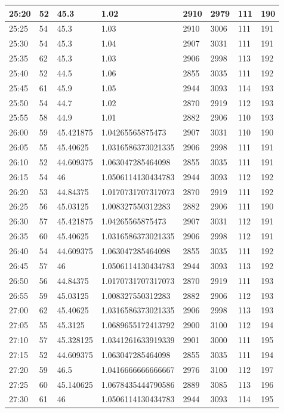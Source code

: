 \documentclass[
]{book}
\begin{document}
\begin{tabular}{l|l|l|l|l|l|l|l}
25:20 & 52 & 45.3 & 1.02 & 2910 & 2979 & 111 & 190\\
\hline
25:25 & 54 & 45.3 & 1.03 & 2910 & 3006 & 111 & 191\\
\hline
25:30 & 54 & 45.3 & 1.04 & 2907 & 3031 & 111 & 191\\
\hline
25:35 & 62 & 45.3 & 1.03 & 2906 & 2998 & 113 & 192\\
\hline
25:40 & 52 & 44.5 & 1.06 & 2855 & 3035 & 111 & 192\\
\hline
25:45 & 61 & 45.9 & 1.05 & 2944 & 3093 & 114 & 193\\
\hline
25:50 & 54 & 44.7 & 1.02 & 2870 & 2919 & 112 & 193\\
\hline
25:55 & 58 & 44.9 & 1.01 & 2882 & 2906 & 110 & 193\\
\hline
26:00 & 59 & 45.421875 & 1.04265565875473 & 2907 & 3031 & 110 & 190\\
\hline
26:05 & 55 & 45.40625 & 1.0316586373021335 & 2906 & 2998 & 111 & 191\\
\hline
26:10 & 52 & 44.609375 & 1.063047285464098 & 2855 & 3035 & 111 & 191\\
\hline
26:15 & 54 & 46 & 1.0506114130434783 & 2944 & 3093 & 112 & 192\\
\hline
26:20 & 53 & 44.84375 & 1.0170731707317073 & 2870 & 2919 & 111 & 192\\
\hline
26:25 & 56 & 45.03125 & 1.008327550312283 & 2882 & 2906 & 111 & 190\\
\hline
26:30 & 57 & 45.421875 & 1.04265565875473 & 2907 & 3031 & 112 & 191\\
\hline
26:35 & 60 & 45.40625 & 1.0316586373021335 & 2906 & 2998 & 112 & 191\\
\hline
26:40 & 54 & 44.609375 & 1.063047285464098 & 2855 & 3035 & 111 & 192\\
\hline
26:45 & 57 & 46 & 1.0506114130434783 & 2944 & 3093 & 113 & 192\\
\hline
26:50 & 56 & 44.84375 & 1.0170731707317073 & 2870 & 2919 & 111 & 193\\
\hline
26:55 & 59 & 45.03125 & 1.008327550312283 & 2882 & 2906 & 112 & 193\\
\hline
27:00 & 62 & 45.40625 & 1.0316586373021335 & 2906 & 2998 & 113 & 193\\
\hline
27:05 & 55 & 45.3125 & 1.0689655172413792 & 2900 & 3100 & 112 & 194\\
\hline
27:10 & 57 & 45.328125 & 1.0341261633919339 & 2901 & 3000 & 111 & 195\\
\hline
27:15 & 52 & 44.609375 & 1.063047285464098 & 2855 & 3035 & 111 & 194\\
\hline
27:20 & 59 & 46.5 & 1.0416666666666667 & 2976 & 3100 & 112 & 197\\
\hline
27:25 & 60 & 45.140625 & 1.0678435444790586 & 2889 & 3085 & 113 & 196\\
\hline
27:30 & 61 & 46 & 1.0506114130434783 & 2944 & 3093 & 114 & 195\\
\hline
\end{tabular}
\end{document}
